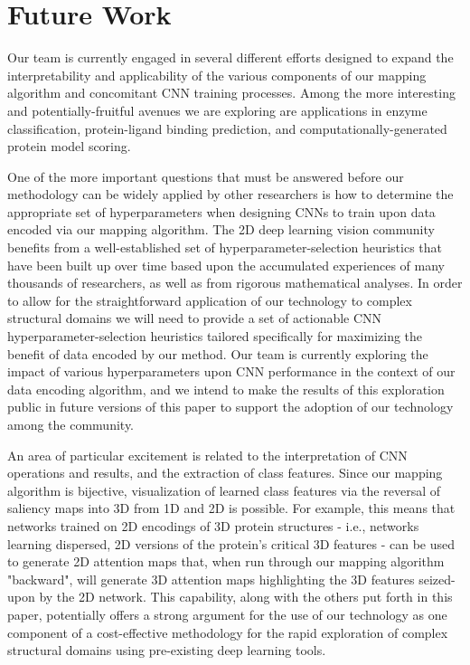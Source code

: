 \documentclass{article}
\begin{document}
\section{Future Work}

Our team is currently engaged in several different efforts designed to expand the interpretability and applicability of the various components of our mapping algorithm and concomitant CNN training processes. Among the more interesting and potentially-fruitful avenues we are exploring are applications in enzyme classification, protein-ligand binding prediction, and computationally-generated protein model scoring.

One of the more important questions that must be answered before our methodology can be widely applied by other researchers is how to determine the appropriate set of hyperparameters when designing CNNs to train upon data encoded via our mapping algorithm. The 2D deep learning vision community benefits from a well-established set of hyperparameter-selection heuristics that have been built up over time based upon the accumulated experiences of many thousands of researchers, as well as from rigorous mathematical analyses. In order to allow for the straightforward application of our technology to complex structural domains we will need to provide a set of actionable CNN hyperparameter-selection heuristics tailored specifically for maximizing the benefit of data encoded by our method. Our team is currently exploring the impact of various hyperparameters upon CNN performance in the context of our data encoding algorithm, and we intend to make the results of this exploration public in future versions of this paper to support the adoption of our technology among the community.  

An area of particular excitement is related to the interpretation of CNN operations and results, and the extraction of class features. Since our mapping algorithm is bijective, visualization of learned class features via the reversal of saliency maps into 3D from 1D and 2D is possible. For example, this means that networks trained on 2D encodings of 3D protein structures - i.e., networks learning dispersed, 2D versions of the protein's critical 3D features - can be used to generate 2D attention maps that, when run through our mapping algorithm "backward", will generate 3D attention maps highlighting the 3D features seized-upon by the 2D network. This capability, along with the others put forth in this paper, potentially offers a strong argument for the use of our technology as one component of a cost-effective methodology for the rapid exploration of complex structural domains using pre-existing deep learning tools. 
\end{document}

